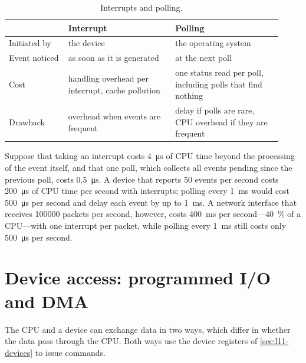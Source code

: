 \documentclass[../main.tex]{subfiles}
\begin{document}
\begin{table}[htbp]
  \centering
  \caption{Interrupts and polling.}
  \label{tab:l11-int-poll}
  \small
  \begin{tabular}{@{}>{\raggedright\arraybackslash}p{0.2\linewidth}>{\raggedright\arraybackslash}p{0.36\linewidth}>{\raggedright\arraybackslash}p{0.36\linewidth}@{}}
    \toprule
    & Interrupt & Polling \\
    \midrule
    Initiated by & the device & the operating system \\
    Event noticed & as soon as it is generated & at the next poll \\
    Cost & handling overhead per interrupt, cache pollution & one status
      read per poll, including polls that find nothing \\
    Drawback & overhead when events are frequent & delay if polls are rare,
      CPU overhead if they are frequent \\
    \bottomrule
  \end{tabular}
\end{table}

\begin{example}
  Suppose that taking an interrupt costs \SI{4}{\micro\second} of CPU time
  beyond the processing of the event itself, and that one poll, which
  collects all events pending since the previous poll, costs
  \SI{0.5}{\micro\second}.  A device that reports 50 events per second costs
  \SI{200}{\micro\second} of CPU time per second with interrupts; polling
  every \SI{1}{\milli\second} would cost \SI{500}{\micro\second} per second
  and delay each event by up to \SI{1}{\milli\second}.  A network interface
  that receives \num{100000} packets per second, however, costs
  \SI{400}{\milli\second} per second---\SI{40}{\percent} of a CPU---with one
  interrupt per packet, while polling every \SI{1}{\milli\second} still costs
  only \SI{500}{\micro\second} per second.
\end{example}

\section{Device access: programmed I/O and DMA}
\label{sec:l11-pio-dma}

The CPU and a device can exchange data in two ways, which differ in whether
the data pass through the CPU.  Both ways use the device registers of
\cref{sec:l11-devices} to issue commands.
\end{document}
